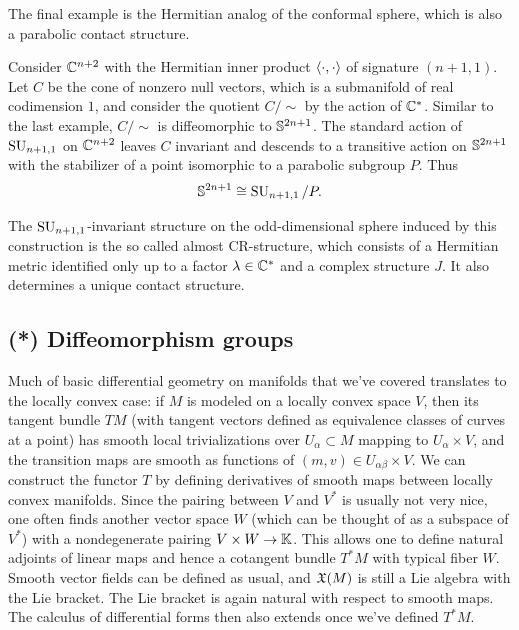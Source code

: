 The final example is the Hermitian analog of the conformal sphere, which is also a parabolic contact structure.

\begin{example}[CR-sphere]
    Consider $\mathbb{C}^{n+2}$ with the Hermitian inner product $\langle\cdot,\cdot\rangle$ of signature $(n+1,1)$. Let $C$ be the cone of nonzero null vectors, which is a submanifold of real codimension $1$, and consider the quotient $C\slash \sim$ by the action of $\mathbb{C}^\ast$. Similar to the last example, $C\slash \sim$ is diffeomorphic to $\mathbb{S}^{2n+1}$. The standard action of $\operatorname{SU}_{n+1,1}$ on $\mathbb{C}^{n+2}$ leaves $C$ invariant and descends to a transitive action on $\mathbb{S}^{2n+1}$ with the stabilizer of a point isomorphic to a parabolic subgroup $P$. Thus 
    \[\mathbb{S}^{2n+1}\cong \operatorname{SU}_{n+1,1}\slash P.\]
\end{example}

The $\operatorname{SU}_{n+1,1}$-invariant structure on the odd-dimensional sphere induced by this construction is the so called almost CR-structure, which consists of a Hermitian metric identified only up to a factor $\lambda\in\mathbb{C}^\ast$ and a complex structure $J$. It also determines a unique contact structure.








\subsection{(*) Diffeomorphism groups}\label{sec: Diff groups}


Much of basic differential geometry on manifolds that we've covered translates to the locally convex case: if $M$ is modeled on a locally convex space $V$, then its tangent bundle $TM$ (with tangent vectors defined as equivalence classes of curves at a point) has smooth local trivializations over $U_\alpha\subset M$ mapping to $U_\alpha\times V$, and the transition maps are smooth as functions of $(m,v)\in U_{\alpha\beta}\times V$. We can construct the functor $T$ by defining derivatives of smooth maps between locally convex manifolds. Since the pairing between $V$ and $V^\ast$ is usually not very nice, one often finds another vector space $W$ (which can be thought of as a subspace of $V^\ast$) with a nondegenerate pairing $V\times W\to \mathbb{K}$. This allows one to define natural adjoints of linear maps and hence a cotangent bundle $T^\ast M$ with typical fiber $W$. Smooth vector fields can be defined as usual, and $\mathfrak{X}(M)$ is still a Lie algebra with the Lie bracket. The Lie bracket is again natural with respect to smooth maps. The calculus of differential forms then also extends once we've defined $T^\ast M$.


